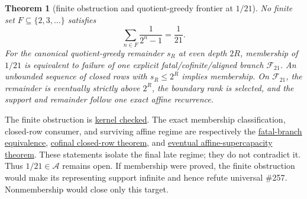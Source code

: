\documentclass[11pt]{article}
\newcommand{\commit}{99f4bf47422abbd8757cbb22b50ba079d764d3a7}
\newcommand{\repobase}{https://github.com/wcook04/plectis-erdos/blob/\commit}
\newcommand{\PK}{Erdos249257}
\newtheorem{theorem}{Theorem}[section]
\theoremstyle{definition}
\theoremstyle{remark}
\begin{document}
\begin{theorem}[finite obstruction and quotient-greedy frontier at \(1/21\)]
\label{res:twentyonefrontier}
No finite set \(F\subseteq\{2,3,\ldots\}\) satisfies
\[
 \sum_{n\in F}\frac1{2^n-1}=\frac1{21}.
\]
For the canonical quotient-greedy remainder \(s_R\) at even depth \(2R\),
membership of \(1/21\) is equivalent to failure of one explicit
fatal/cofinite/aligned branch \(\mathcal F_{21}\).  An unbounded sequence of
closed rows with \(s_R\le2^R\) implies membership.  On
\(\mathcal F_{21}\), the remainder is eventually strictly above \(2^R\), the
boundary rank is selected, and the support and remainder follow one exact
affine recurrence.
\end{theorem}
\noindent The finite obstruction is
\href{\repobase/ErdosProblems/Erdos257/HalfCounterexampleFrontier.lean\#L59}{kernel checked}.
The exact membership classification, closed-row consumer, and surviving
affine regime are respectively the
\href{\repobase/\PK/TwentyOneQuotientGreedy.lean\#L3508}{fatal-branch equivalence},
\href{\repobase/\PK/TwentyOneQuotientGreedy.lean\#L5553}{cofinal closed-row theorem},
and
\href{\repobase/\PK/TwentyOneQuotientGreedy.lean\#L5657}{eventual affine-supercapacity theorem}.
These statements isolate the final late regime; they do not contradict it.
Thus \(1/21\in\mathcal A\) remains open.  If membership were proved, the
finite obstruction would make its representing support infinite and hence
refute universal \#257.  Nonmembership would close only this target.
\end{document}
